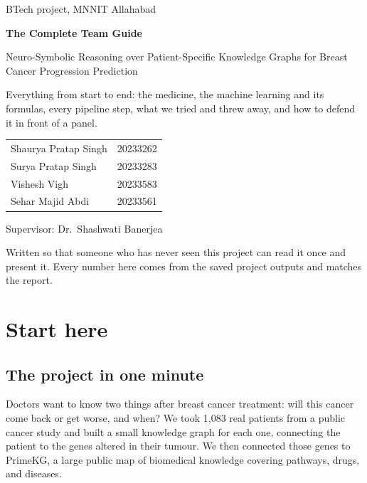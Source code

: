 \documentclass[11pt,a4paper]{article}
\begin{document}
\begin{titlepage}
\vspace*{2.5cm}
{\color{muted}\large BTech project, MNNIT Allahabad}\par\vspace{0.6cm}
{\fontsize{30}{36}\selectfont\bfseries\color{navy} The Complete Team Guide\par}
\vspace{0.6cm}
{\LARGE Neuro-Symbolic Reasoning over Patient-Specific Knowledge Graphs for Breast Cancer Progression Prediction\par}
\vspace{1.2cm}
{\large Everything from start to end: the medicine, the machine learning and its formulas, every pipeline step, what we tried and threw away, and how to defend it in front of a panel.\par}
\vspace{2.2cm}
\begin{tabular}{@{}ll}
Shaurya Pratap Singh & 20233262\\
Surya Pratap Singh & 20233283\\
Vishesh Vigh & 20233583\\
Sehar Majid Abdi & 20233561
\end{tabular}\par\vspace{0.8cm}
Supervisor: Dr.\ Shashwati Banerjea\par
\vfill
{\small\color{muted}Written so that someone who has never seen this project can read it once and present it. Every number here comes from the saved project outputs and matches the report.}
\end{titlepage}

\tableofcontents
\newpage

\section{Start here}

\subsection{The project in one minute}
Doctors want to know two things after breast cancer treatment: will this cancer come back or get worse, and when? We took 1,083 real patients from a public cancer study and built a small knowledge graph for each one, connecting the patient to the genes altered in their tumour. We then connected those genes to PrimeKG, a large public map of biomedical knowledge covering pathways, drugs, and diseases.
\end{document}
